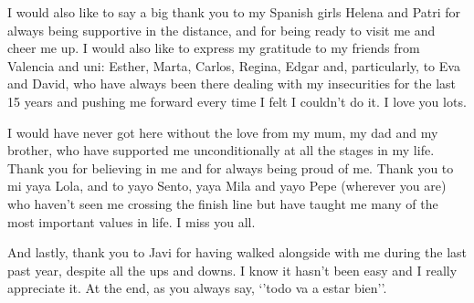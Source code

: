 {\begin{minipage}[t]{1.1\linewidth}
\noindent I would also like to say a big thank you to my Spanish girls Helena and Patri for always being supportive in the distance, and for being ready to visit me and cheer me up. I would also like to express my gratitude to my friends from Valencia and uni: Esther, Marta, Carlos, Regina, Edgar and, particularly, to Eva and David, who have always been there dealing with my insecurities for the last 15 years and pushing me forward every time I felt I couldn't do it. I love you lots. 

\noindent I would have never got here without the love from my mum, my dad and my brother, who have supported me unconditionally at all the stages in my life. Thank you for believing in me and for always being proud of me. Thank you to mi yaya Lola, and to yayo Sento, yaya Mila and yayo Pepe (wherever you are) who haven’t seen me crossing the finish line but have taught me many of the most important values in life. I miss you all.

\noindent And lastly, thank you to Javi for having walked alongside with me during the last past year, despite all the ups and downs. I know it hasn’t been easy and I really appreciate it. At the end, as you always say, ‘’todo va a estar bien’’.
\end{minipage}}


